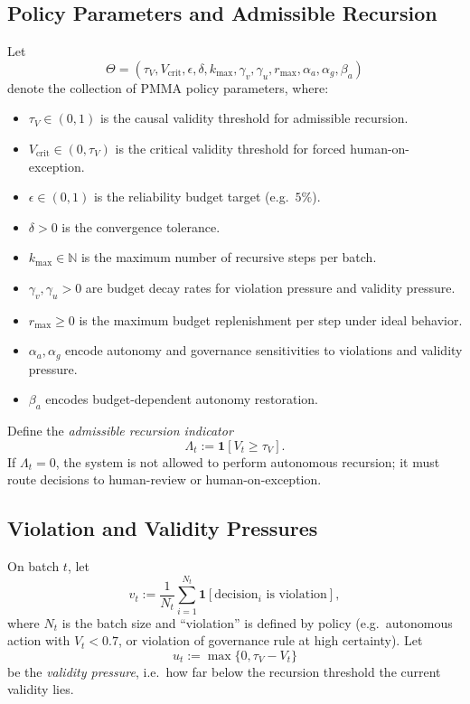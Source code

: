\documentclass[11pt]{article}
\begin{document}
\subsection{Policy Parameters and Admissible Recursion}

Let
\[
  \Theta
  = (\tau_V, V_{\mathrm{crit}}, \epsilon, \delta, k_{\max},
     \gamma_v, \gamma_u, r_{\max}, \alpha_a, \alpha_g, \beta_a)
\]
denote the collection of PMMA policy parameters, where:
\begin{itemize}
  \item $\tau_V \in (0,1)$ is the causal validity threshold for admissible recursion.
  \item $V_{\mathrm{crit}} \in (0,\tau_V)$ is the critical validity threshold for forced human-on-exception.
  \item $\epsilon \in (0,1)$ is the reliability budget target (e.g.\ $5\%$).
  \item $\delta > 0$ is the convergence tolerance.
  \item $k_{\max} \in \mathbb{N}$ is the maximum number of recursive steps per batch.
  \item $\gamma_v, \gamma_u > 0$ are budget decay rates for violation pressure and validity pressure.
  \item $r_{\max} \ge 0$ is the maximum budget replenishment per step under ideal behavior.
  \item $\alpha_a, \alpha_g$ encode autonomy and governance sensitivities to violations and validity pressure.
  \item $\beta_a$ encodes budget-dependent autonomy restoration.
\end{itemize}

Define the \emph{admissible recursion indicator}
\[
  \Lambda_t := \mathbf{1}[V_t \ge \tau_V].
\]
If $\Lambda_t = 0$, the system is not allowed to perform autonomous recursion; it must route decisions to human-review or human-on-exception.

\subsection{Violation and Validity Pressures}

On batch $t$, let
\[
  v_t := \frac{1}{N_t} \sum_{i=1}^{N_t} \mathbf{1}[\text{decision}_i \text{ is violation}],
\]
where $N_t$ is the batch size and ``violation'' is defined by policy (e.g.\ autonomous action with $V_t < 0.7$, or violation of governance rule at high certainty).
Let
\[
  u_t := \max\{0, \tau_V - V_t\}
\]
be the \emph{validity pressure}, i.e.\ how far below the recursion threshold the current validity lies.
\end{document}
